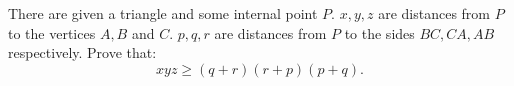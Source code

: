 There are given a triangle and some internal point $P$. $x,y,z$ are distances from $P$ to the vertices $A,B$ and $C$. $p,q,r$ are distances from $P$ to the sides $BC,CA,AB$ respectively. Prove that:
$$xyz\ge(q+r)(r+p)(p+q).$$